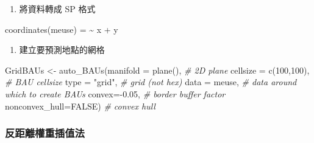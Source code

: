 \documentclass[
]{book}
\newenvironment{Shaded}{\begin{snugshade}}{\end{snugshade}}
\newcommand{\AttributeTok}[1]{\textcolor[rgb]{0.77,0.63,0.00}{#1}}
\newcommand{\CommentTok}[1]{\textcolor[rgb]{0.56,0.35,0.01}{\textit{#1}}}
\newcommand{\ConstantTok}[1]{\textcolor[rgb]{0.00,0.00,0.00}{#1}}
\newcommand{\DecValTok}[1]{\textcolor[rgb]{0.00,0.00,0.81}{#1}}
\newcommand{\ErrorTok}[1]{\textcolor[rgb]{0.64,0.00,0.00}{\textbf{#1}}}
\newcommand{\FloatTok}[1]{\textcolor[rgb]{0.00,0.00,0.81}{#1}}
\newcommand{\FunctionTok}[1]{\textcolor[rgb]{0.00,0.00,0.00}{#1}}
\newcommand{\NormalTok}[1]{#1}
\newcommand{\OtherTok}[1]{\textcolor[rgb]{0.56,0.35,0.01}{#1}}
\newcommand{\SpecialCharTok}[1]{\textcolor[rgb]{0.00,0.00,0.00}{#1}}
\newcommand{\StringTok}[1]{\textcolor[rgb]{0.31,0.60,0.02}{#1}}
\providecommand{\tightlist}{%
  \setlength{\itemsep}{0pt}\setlength{\parskip}{0pt}}
\begin{document}
\begin{enumerate}
\def\labelenumi{\arabic{enumi}.}
\setcounter{enumi}{1}
\tightlist
\item
  將資料轉成 SP 格式
\end{enumerate}

\begin{Shaded}
\begin{Highlighting}[]
\FunctionTok{coordinates}\NormalTok{(meuse) }\OtherTok{=} \ErrorTok{\textasciitilde{}}\NormalTok{ x }\SpecialCharTok{+}\NormalTok{ y}
\end{Highlighting}
\end{Shaded}

\begin{enumerate}
\def\labelenumi{\arabic{enumi}.}
\setcounter{enumi}{2}
\tightlist
\item
  建立要預測地點的網格
\end{enumerate}

\begin{Shaded}
\begin{Highlighting}[]
\NormalTok{GridBAUs }\OtherTok{\textless{}{-}} \FunctionTok{auto\_BAUs}\NormalTok{(}\AttributeTok{manifold =} \FunctionTok{plane}\NormalTok{(), }\CommentTok{\# 2D plane}
                       \AttributeTok{cellsize =} \FunctionTok{c}\NormalTok{(}\DecValTok{100}\NormalTok{,}\DecValTok{100}\NormalTok{), }\CommentTok{\# BAU cellsize}
                       \AttributeTok{type =} \StringTok{"grid"}\NormalTok{, }\CommentTok{\# grid (not hex)}
                       \AttributeTok{data =}\NormalTok{ meuse, }\CommentTok{\# data around which to create BAUs}
                       \AttributeTok{convex=}\SpecialCharTok{{-}}\FloatTok{0.05}\NormalTok{, }\CommentTok{\# border buffer factor}
                       \AttributeTok{nonconvex\_hull=}\ConstantTok{FALSE}\NormalTok{) }\CommentTok{\# convex hull}
\end{Highlighting}
\end{Shaded}

\hypertarget{ux53cdux8dddux96e2ux6b0aux91cdux63d2ux503cux6cd5}{%
\subsubsection{反距離權重插值法}\label{ux53cdux8dddux96e2ux6b0aux91cdux63d2ux503cux6cd5}}
\end{document}

